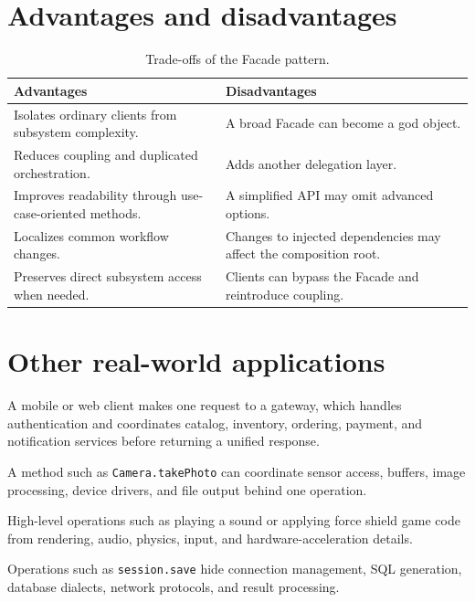 \documentclass[11pt,a4paper]{report}
\begin{document}
\section{Advantages and disadvantages}
\begin{table}[htbp]
\centering
\caption{Trade-offs of the Facade pattern.}
\begin{tabularx}{\textwidth}{@{}YY@{}}
\toprule
\textbf{Advantages} & \textbf{Disadvantages} \\
\midrule
Isolates ordinary clients from subsystem complexity. & A broad Facade can become a god object. \\
Reduces coupling and duplicated orchestration. & Adds another delegation layer. \\
Improves readability through use-case-oriented methods. & A simplified API may omit advanced options. \\
Localizes common workflow changes. & Changes to injected dependencies may affect the composition root. \\
Preserves direct subsystem access when needed. & Clients can bypass the Facade and reintroduce coupling. \\
\bottomrule
\end{tabularx}
\end{table}

\section{Other real-world applications}
\begin{description}[style=nextline]
  \item[Web development: API Gateway]
  A mobile or web client makes one request to a gateway, which handles
  authentication and coordinates catalog, inventory, ordering, payment, and
  notification services before returning a unified response.

  \item[Mobile development: hardware abstraction]
  A method such as \texttt{Camera.takePhoto} can coordinate sensor access,
  buffers, image processing, device drivers, and file output behind one operation.

  \item[Game development: engine API]
  High-level operations such as playing a sound or applying force shield game
  code from rendering, audio, physics, input, and hardware-acceleration details.

  \item[Database access: JDBC and ORMs]
  Operations such as \texttt{session.save} hide connection management,
  SQL generation, database dialects, network protocols, and result processing.
\end{description}
\end{document}
